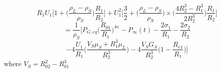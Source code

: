 \documentclass{article}
\begin{document}
\begin{multicols}{2}
\begin{equation*}
R_1U_1 \Bigg[1+ \Bigg(\frac{\rho_L - \rho_S}{\rho_S}\Bigg)\frac{R_1}{R_2}\Bigg] 
+ U_1^2\Bigg[\frac{3}{2} + \Bigg(\frac{\rho_L - \rho_S}{\rho_S}\Bigg)\times \Bigg(\frac{4R_2^3 - R_1^3}{2R_2^3}\Bigg)\frac{R_1}{R_2}\Bigg] 
\end{equation*}
\begin{equation*}
= \frac{1}{\rho_S}\Bigg[P_{G,eq}\Bigg(\frac{R_{01}}{R_1}\Bigg)^{4\kappa} - P_\infty(t) - \frac{2\sigma_1}{R_1}-\frac{2\sigma_2}{R_2}
\end{equation*}
\begin{equation*}
 - 4\frac{U_1}{R_1}\Bigg(\frac{V_S \mu_S + R_1^3 \mu_L}{R_2^3}\Bigg) - 4 \frac{V_SG_S}{R_2^3}\Bigg(1 - \frac{R_{e1}}{R_1}\Bigg)\Bigg]
\end{equation*}
where $V_S = R^2_{02} - R^3_{01}$


\newpage

\end{multicols}
\end{document}
